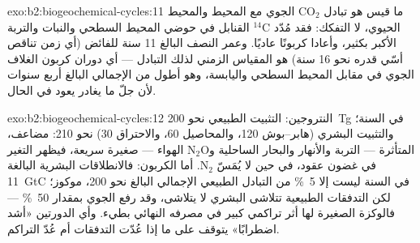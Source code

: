 \begin{solution}{exo:b2:biogeochemical-cycles:11}
ما قيس هو تبادل $\mathrm{CO_2}$ الجوي مع
المحيط والمحيط الحيوي، لا التفكك: فقد مُدّد $\mathrm{{}^{14}C}$ القنابل
في حوضي المحيط السطحي والنبات والتربة الأكبر بكثير،
وأعادا كربونًا عاديًا. وعمر النصف البالغ 11 سنة
للفائض (أي زمن تناقص أسّي قدره نحو 16 سنة) هو المقياس
الزمني لذلك التبادل --- أي دوران كربون الغلاف الجوي
في مقابل المحيط السطحي واليابسة، وهو أطول من
 الإجمالي البالغ أربع سنوات لأن جلّ ما يغادر يعود
في الحال.
\end{solution}

\begin{solution}{exo:b2:biogeochemical-cycles:12}
النتروجين: التثبيت الطبيعي نحو 200~Tg في السنة؛ والتثبيت البشري
(هابر--بوش 120، والمحاصيل 60، والاحتراق 30) نحو 210: 
مضاعف،  المتأثرة --- التربة والأنهار والبحار
الساحلية و$\mathrm{N_2O}$ الهواء --- صغيرة سريعة، فيظهر التغير
في غضون عقود، في حين لا يُمَسّ  $\mathrm{N_2}$.
أما الكربون: فالانطلاقات البشرية البالغة 11~GtC في السنة ليست إلا \qty{5}{\%} من
التبادل الطبيعي الإجمالي البالغ نحو 200،  موكوز؛
لكن التدفقات الطبيعية تتلاشى  البشري لا يتلاشى، وقد
رفع  الجوي بمقدار \qty{50}{\%} --- فالوكزة الصغيرة
لها أثر تراكمي كبير في  مصرفه النهائي بطيء.
وأي الدورتين «أشد اضطرابًا» يتوقف على ما إذا
عُدّت التدفقات أم عُدّ التراكم.
\end{solution}

